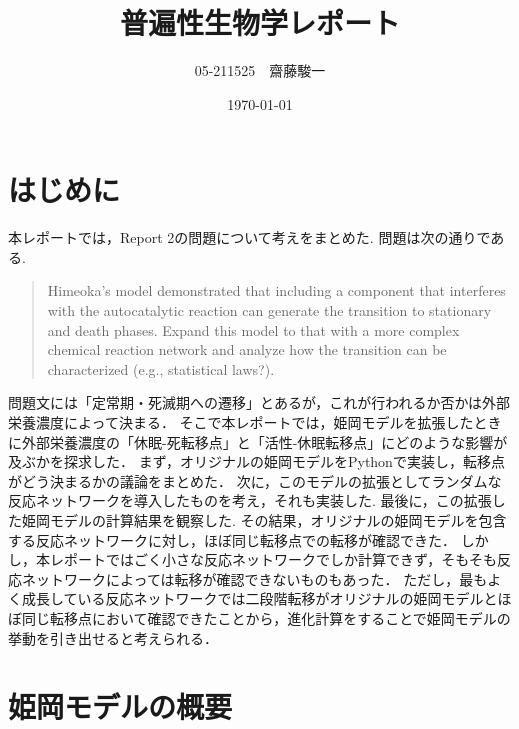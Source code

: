 \documentclass[a4paper,11pt]{jsarticle}
\begin{document}
\title{普遍性生物学レポート}
\author{05-211525　齋藤駿一}
\date{\today}
\maketitle

\section{はじめに}
本レポートでは，Report 2の問題について考えをまとめた.
問題は次の通りである.
\begin{quote}
  Himeoka's model demonstrated that
  including a component that interferes with
  the autocatalytic reaction can generate
  the transition to stationary and death
  phases.
  Expand this model to that with a more
  complex chemical reaction network and
  analyze how the transition can be
  characterized (e.g., statistical laws?).
\end{quote}
問題文には「定常期・死滅期への遷移」とあるが，これが行われるか否かは外部栄養濃度によって決まる．
そこで本レポートでは，姫岡モデルを拡張したときに外部栄養濃度の「休眠-死転移点」と「活性-休眠転移点」にどのような影響が及ぶかを探求した．
まず，オリジナルの姫岡モデルをPythonで実装し，転移点がどう決まるかの議論をまとめた．
次に，このモデルの拡張としてランダムな反応ネットワークを導入したものを考え，それも実装した.
最後に，この拡張した姫岡モデルの計算結果を観察した.
その結果，オリジナルの姫岡モデルを包含する反応ネットワークに対し，ほぼ同じ転移点での転移が確認できた．
しかし，本レポートではごく小さな反応ネットワークでしか計算できず，そもそも反応ネットワークによっては転移が確認できないものもあった．
ただし，最もよく成長している反応ネットワークでは二段階転移がオリジナルの姫岡モデルとほぼ同じ転移点において確認できたことから，進化計算をすることで姫岡モデルの挙動を引き出せると考えられる．

\section{姫岡モデルの概要}
\end{document}
